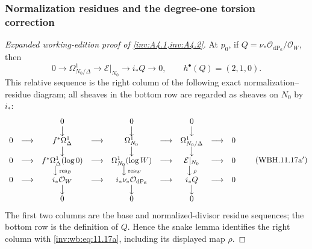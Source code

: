 \subsubsection{Normalization residues and the degree-one torsion correction}\label{inv:wbproof:torsion-residue}
\begin{proof}[Expanded working-edition proof of \cref{inv:A4.1,inv:A4.2}]

At $p_0$, if
$Q=\nu_*\mathcal O_{\mathrm{dP}_6}/\mathcal O_W$, then
\[
 0\longrightarrow\Omega^1_{N_0/\Delta}\longrightarrow
 \mathcal E|_{N_0}\longrightarrow i_*Q\longrightarrow0,
 \qquad h^\bullet(Q)=(2,1,0).
\tag{WBH.11.17a}\label{inv:wb:eq:11.17a}
\]
This relative sequence is the right column of the following exact
normalization--residue diagram; all sheaves in the bottom row are regarded as
sheaves on $N_0$ by $i_*$:
\[
\begin{array}{ccccccccc}
&&0&&0&&0&&\\
&&\big\downarrow&&\big\downarrow&&\big\downarrow&&\\
0&\longrightarrow&f^*\Omega^1_\Delta&\longrightarrow&\Omega^1_{N_0}
 &\longrightarrow&\Omega^1_{N_0/\Delta}&\longrightarrow&0\\
&&\big\downarrow&&\big\downarrow&&\big\downarrow&&\\
0&\longrightarrow&f^*\Omega^1_\Delta(\log0)&\longrightarrow&
 \Omega^1_{N_0}(\log W)&\longrightarrow&\mathcal E|_{N_0}
 &\longrightarrow&0\\
&&\big\downarrow\,{\scriptstyle\operatorname{res}_B}
&&\big\downarrow\,{\scriptstyle\operatorname{res}_W}
&&\big\downarrow\,{\scriptstyle\rho}&&\\
0&\longrightarrow&i_*\mathcal O_W&\longrightarrow&
 i_*\nu_*\mathcal O_{\mathrm{dP}_6}&\longrightarrow&i_*Q
 &\longrightarrow&0\\
&&\big\downarrow&&\big\downarrow&&\big\downarrow&&\\
&&0&&0&&0&&
\end{array}
\tag{WBH.11.17a$'$}\label{inv:wb:eq:11.17a-prime}
\]
The first two columns are the base and normalized-divisor residue sequences;
the bottom row is the definition of $Q$.  Hence the snake lemma identifies
the right column with \eqref{inv:wb:eq:11.17a}, including its displayed map $\rho$.


\end{proof}
